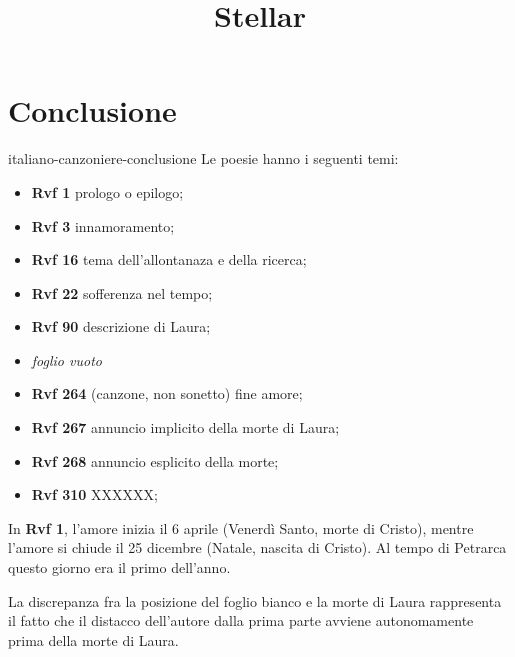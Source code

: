 \documentclass[preview]{standalone}
\begin{document}
\title{Stellar}
\genpage

\section{Conclusione}

\begin{snippet}{italiano-canzoniere-conclusione}
    Le poesie hanno i seguenti temi:
    \begin{itemize}
        \item \textbf{Rvf 1} prologo o epilogo;
        \item \textbf{Rvf 3} innamoramento;
        \item \textbf{Rvf 16} tema dell'allontanaza e della ricerca;
        \item \textbf{Rvf 22} sofferenza nel tempo;
        \item \textbf{Rvf 90} descrizione di Laura;
        \item \textit{foglio vuoto}
        \item \textbf{Rvf 264} (canzone, non sonetto) fine amore;
        \item \textbf{Rvf 267} annuncio implicito della morte di Laura;
        \item \textbf{Rvf 268} annuncio esplicito della morte;
        \item \textbf{Rvf 310} XXXXXX;
    \end{itemize}
    
    In \textbf{Rvf 1}, l'amore inizia il 6 aprile (Venerdì Santo, morte di Cristo),
    mentre l'amore si chiude il 25 dicembre (Natale, nascita di Cristo).
    Al tempo di Petrarca questo giorno era il primo dell'anno. 
    
    La discrepanza fra la posizione del foglio bianco e la morte di Laura rappresenta il
    fatto che il distacco dell'autore dalla prima parte
    avviene autonomamente prima della morte di Laura.
\end{snippet}
\end{document}
